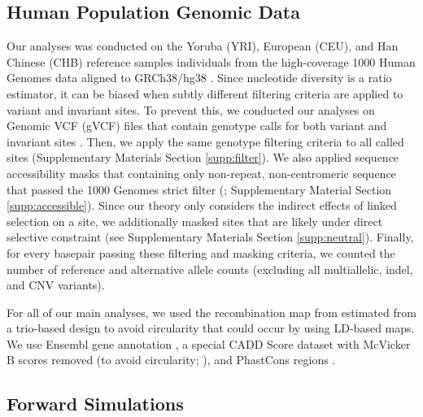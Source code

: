 \documentclass[11pt]{article}
\begin{document}
\subsection*{Human Population Genomic Data}
\label{sec:methods-data}

Our analyses was conducted on the Yoruba (YRI), European (CEU), and Han Chinese
(CHB) reference samples individuals from the high-coverage 1000 Human Genomes
data aligned to GRCh38/hg38 \parencite{Byrska-Bishop2022-tn}. Since nucleotide
diversity is a ratio estimator, it can be biased when subtly different
filtering criteria are applied to variant and invariant sites. To prevent this,
we conducted our analyses on Genomic VCF (gVCF) files that contain genotype
calls for both variant and invariant sites \parencite{Illumina_Inc2020-dk}.
Then, we apply the same genotype filtering criteria to all called sites
(Supplementary Materials Section \ref{supp:filter}). We also applied sequence
accessibility masks that containing only non-repeat, non-centromeric sequence
that passed the 1000 Genomes strict filter
(\cite{1000_Genomes_Project_Consortium2015-mi}; Supplementary Material Section
\ref{supp:accessible}). Since our theory only considers the indirect effects of
linked selection on a site, we additionally masked sites that are likely under
direct selective constraint (see Supplementary Materials Section
\ref{supp:neutral}). Finally, for every basepair passing these filtering and
masking criteria, we counted the number of reference and alternative allele
counts (excluding all multiallelic, indel, and CNV variants).

For all of our main analyses, we used the recombination map from
\textcite{Halldorsson2019-ey} estimated from a trio-based design to avoid
circularity that could occur by using LD-based maps. We use Ensembl gene
annotation \parencite{Cunningham2022-vk}, a special CADD Score dataset with
McVicker B scores removed (to avoid circularity;
\cite{Kircher2014-bv,Rentzsch2019-lr}), and PhastCons regions
\parencite{Siepel2005-wh}.

\subsection*{Forward Simulations}
\label{sec:methods-sim}
\end{document}
